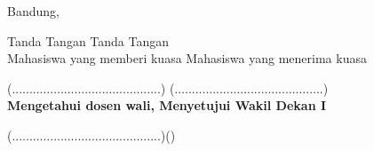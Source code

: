 \documentclass[12pt]{letter}
\begin{document}
{		\begin{flushright}
			Bandung, 			
		\end{flushright}
Tanda Tangan \hspace{7.3cm}Tanda Tangan \\
Mahasiswa yang memberi kuasa \hspace{4cm} Mahasiswa yang menerima kuasa \\
\begin{flushright}
		\end{flushright}
			\vspace{1cm}
			
	(...........................................)\hspace{4.6cm} (...........................................)\\
	
	\textbf{Mengetahui dosen wali, \hspace{4.8cm} Menyetujui Wakil Dekan I}
	\vspace{2cm}
			
	(...........................................)\hspace{4.8cm}()
	\thispagestyle{empty}
		\newpage

}
 
\end{document}

